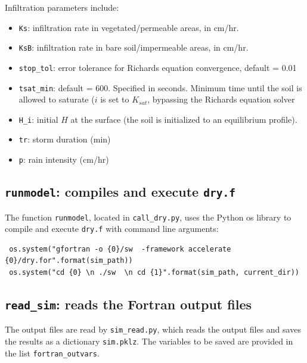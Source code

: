 \documentclass{article}
\newcommand{\code}[1]{\texttt{#1}}
\begin{document}
Infiltration parameters include:
\begin{itemize}
	\item \code{Ks}: infiltration rate in vegetated/permeable areas, in cm/hr.  
	\item \code{KsB}: infiltration rate in bare soil/impermeable areas, in cm/hr.
	
	\item \code{stop\_tol}: error tolerance for Richards equation convergence,	default = 0.01

	\item \code{tsat\_min}: default = 600.  Specified in seconds.  Minimum time until the soil is allowed to saturate ($i$ is set to $K_{sat}$, bypassing the Richards equation solver
	\item \code{H\_i}: initial $H$ at the surface (the soil is initialized to an equilibrium profile).

	\item \code{tr}: storm duration (min)
	\item \code{p}: rain intensity (cm/hr)
\end{itemize}


\subsection{\code{runmodel}: compiles and execute \code{dry.f}}
The function \code{runmodel}, located in \code{call\_dry.py}, uses the Python os library to compile and execute \code{dry.f} with command line arguments: 

\begin{verbatim}
 os.system("gfortran -o {0}/sw  -framework accelerate {0}/dry.for".format(sim_path))
 os.system("cd {0} \n ./sw  \n cd {1}".format(sim_path, current_dir))	
\end{verbatim}

    
\subsection{\code{read\_sim}: reads the Fortran output files }

The output files are read by \code{sim\_read.py}, which reads the output files and saves the results as a dictionary  \code{sim.pklz}.  The variables to be saved are provided in the list \code{fortran\_outvars}.
\end{document}
